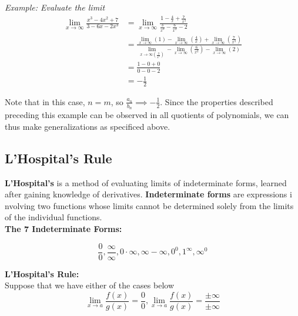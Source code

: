         \noindent \color{blue} \textit{Example: Evaluate the limit} \color{black} \\

        \begin{align*}
            \lim_{x\to\infty}\frac{x^3-4x^2+7}{3-6x-2x^3} &=
            \lim_{x\to\infty}\frac{1-\frac{4}{x}+\frac{7}{x^3}}{\frac{3}{x^3}-\frac{6}{x^2}-2} \\
            &= \frac{\lim_{x\to\infty}(1)-\lim_{x\to\infty}\left(\frac{4}{x}\right)+\lim_{x\to\infty}\left(\frac{7}{x^3}\right)}{\lim_{x\to\infty\left(\frac{3}{x^3}\right)}-\lim_{x\to\infty}\left(\frac{6}{x^2}\right)-\lim_{x\to\infty}(2)} \\
            &= \frac{1-0+0}{0-0-2} \\
            &= -\frac{1}{2}
        \end{align*}

        \noindent Note that in this case, $n=m$, so $\frac{a_n}{b_n}\implies -\frac{1}{2}$.
        Since the properties described preceding this example can be observed in all quotients
        of polynomials, we can thus make generalizations as specificed above.



    \subsection{L'Hospital's Rule}
        \textbf{L'Hospital's} is a method of evaluating limits of indeterminate forms, learned
        after gaining knowledge of derivatives. \textbf{Indeterminate forms} are expressions i
        nvolving two functions whose limits cannot be determined solely from the limits of the
        individual functions. \\

        \noindent \color{purple} \textbf{The 7 Indeterminate Forms:} \\ \color{black}

        \begin{equation*}
            \frac{0}{0}, \frac{\infty}{\infty}, 0\cdot\infty, \infty-\infty, 0^0, 1^\infty, \infty^0
        \end{equation*}

        \noindent \color{purple} \textbf{L'Hospital's Rule:} \color{black} \\
        Suppose that we have either of the cases below \\

        \begin{equation*}
            \lim_{x\to a}\frac{f(x)}{g(x)}=\frac{0}{0}, \lim_{x\to a}\frac{f(x)}{g(x)}=\frac{\pm\infty}{\pm\infty}
        \end{equation*}

